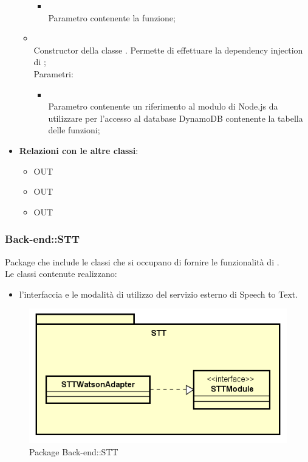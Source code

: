 \begin{itemize}
\begin{itemize}
		\begin{itemize}
			\item {} \\
			Parametro contenente la funzione;
		\end{itemize}
		\item[]  \\		Constructor della classe . Permette di effettuare la dependency injection di ;\\
		Parametri:
		\begin{itemize}
			\item {} \\
			Parametro contenente un riferimento al modulo di Node.js da utilizzare per l'accesso al database DynamoDB contenente la tabella delle funzioni;
		\end{itemize}
	\end{itemize}
	\item \textbf{Relazioni con le altre classi}:
	\begin{itemize}
		\item OUT \hyperlink{Task_label}{}
		\item OUT \hyperlink{TaskObservable_label}{}
		\item OUT \hyperlink{ErrorObservable_label}{}
	\end{itemize}
\end{itemize}
\FloatBarrier

\subsubsection{Back-end::STT}
Package che include le classi che si occupano di fornire le funzionalità di .\\
Le classi contenute realizzano:
\begin{itemize}
 \item l'interfaccia e le modalità di utilizzo del servizio esterno di Speech to Text.
\end{itemize}
\begin{figure}[h] \centering \includegraphics[width=\textwidth,height=\textheight,keepaspectratio]{images/diagrams/back-end/Official_Backend_0304/STT.png}
	\caption{Package Back-end::STT}
\end{figure}
